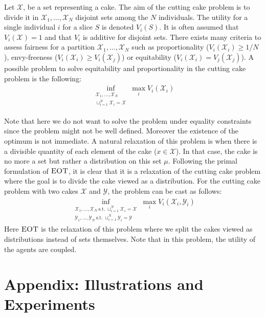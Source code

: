 Let $\mathcal{X}$, be a set representing a cake. The aim of the cutting cake problem is to divide it in $\mathcal{X}_1,\dots,\mathcal{X}_N$ disjoint sets among the $N$ individuals. The utility for a single individual $i$ for a slice $S$ is denoted $V_i(S)$. It is often assumed that $V_i(\mathcal{X}) = 1$ and that $V_i$ is additive for disjoint sets. There exists many criteria to assess fairness for a partition $\mathcal{X}_1,\dots,\mathcal{X}_N$ such as proportionality ($V_i(\mathcal{X}_i)\geq 1/N$), envy-freeness ($V_i(\mathcal{X}_i)\geq V_i(\mathcal{X}_j)$) or equitability ($V_i(\mathcal{X}_i)= V_j(\mathcal{X}_j)$). A possible problem to solve equitability and proportionality in the cutting cake problem is the following:
\begin{align}
    \inf_{\substack{\mathcal{X}_1,...,\mathcal{X}_N\\  \sqcup_{i=1}^N\mathcal{X}_i=\mathcal{X}}}\max_i V_i(\mathcal{X}_i)
\end{align}

Note that here we do not want to solve the problem under equality constraints since the problem might not be well defined. Moreover the existence of the optimum is not immediate. A natural relaxation of this problem is when there is a divisible quantity of each element of the cake ($x\in\mathcal{X}$). In that case, the cake is no more a set but rather a distribution on this set $\mu$. Following the primal formulation of $\textsc{EOT}$, it is clear that it is a relaxation of the cutting cake problem where the goal is to divide the cake viewed as a distribution. For the cutting cake problem with two cakes $\mathcal{X}$ and $\mathcal{Y}$, the problem can be cast as follows:
\begin{align}
    \inf_{\substack{\mathcal{X}_1,...,\mathcal{X}_N~\text{s.t.}~\sqcup_{i=1}^N\mathcal{X}_i=\mathcal{X}\\\mathcal{Y}_1,...,\mathcal{Y}_N~\text{s.t.}~\sqcup_{i=1}^N\mathcal{Y}_i=\mathcal{Y}}}\max_i  V_i(\mathcal{X}_i,\mathcal{Y}_i)
\end{align}
Here $\textsc{EOT}$ is the relaxation of this problem where we split the cakes viewed as distributions instead of sets themselves. Note that in this problem, the utility of the agents are coupled.
\newpage

\section{Appendix: Illustrations and Experiments}
\label{appendix-illustrations}

